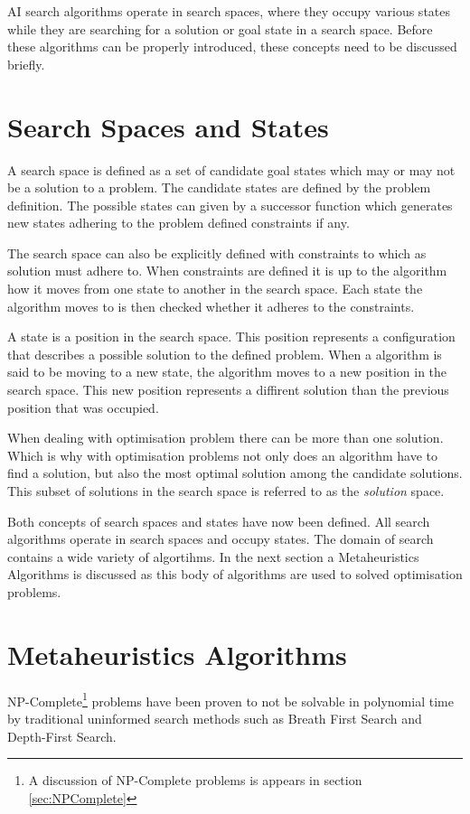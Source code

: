 \gls{AI} search algorithms operate in search spaces, where they occupy various states while they are searching for a solution or goal state in a search space. Before these algorithms can be properly introduced, these concepts need to be discussed briefly.

\section{Search Spaces and States}
A search space is defined as a set of candidate goal states which may or may not be a solution to a problem\cite{AIModernApproach}. The candidate states are defined by the problem definition\cite{AIModernApproach}. The possible states can given by a successor function which generates new states adhering to the problem defined constraints if any\cite{AIModernApproach}. 

The search space can also be explicitly defined with constraints to which as solution must adhere to\cite{AIModernApproach}. When constraints are defined it is up to the algorithm how it moves from one state to another in the search space\cite{AIModernApproach}. Each state the algorithm moves to is then checked whether it adheres to the constraints\cite{AIModernApproach}.

A state is a position in the search space\cite{AIModernApproach}. This position represents a configuration that describes a possible solution to the defined problem\cite{AIModernApproach}. When a algorithm is said to be moving to a new state, the algorithm moves to a new position in the search space\cite{AIModernApproach}. This new position represents a diffirent solution than the previous position that was occupied\cite{AIModernApproach}.

When dealing with optimisation problem there can be more than one solution\cite{AIModernApproach}. Which is why with optimisation problems not only does an algorithm have to find a solution, but also the most optimal solution among the candidate solutions\cite{AIModernApproach}. This subset of solutions in the search space is referred to as the \emph{solution} space.

Both concepts of search spaces and states have now been defined. All search algorithms operate in search spaces and occupy states. The domain of search contains a wide variety of algortihms. In the next section a Metaheuristics Algorithms is discussed as this body of algorithms are used to solved optimisation problems.

\section{Metaheuristics Algorithms}
NP-Complete\footnote{A discussion of NP-Complete problems is appears in section \ref{sec:NPComplete}} problems have been proven to not be solvable in polynomial time by traditional uninformed search methods such as Breath First Search and Depth-First Search\cite{AIModernApproach}. 

